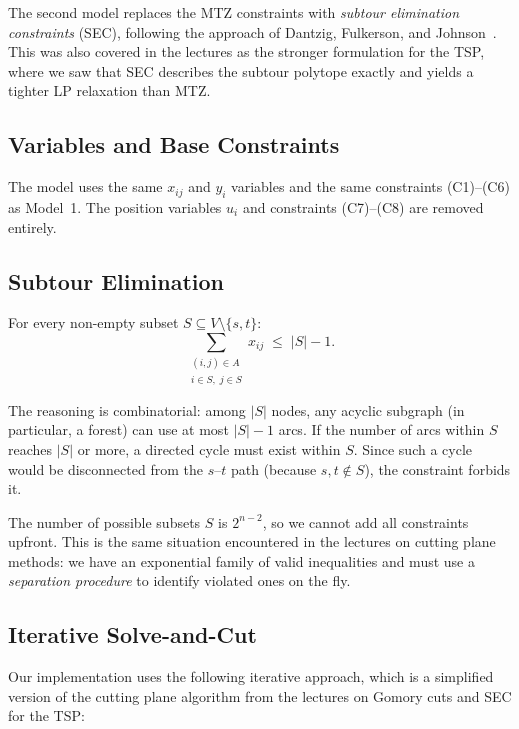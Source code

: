 \documentclass[12pt, a4paper]{article}
\begin{document}
The second model replaces the MTZ constraints with \emph{subtour elimination
constraints} (SEC), following the approach of Dantzig, Fulkerson, and
Johnson~\cite{dantzig}. This was also covered in the lectures as the
stronger formulation for the TSP, where we saw that SEC describes the subtour
polytope exactly and yields a tighter LP relaxation than MTZ.

\subsection{Variables and Base Constraints}

The model uses the same $x_{ij}$ and $y_i$ variables and the same constraints
(C1)--(C6) as Model~1. The position variables $u_i$ and constraints (C7)--(C8) are
removed entirely.

\subsection{Subtour Elimination}

For every non-empty subset $S \subseteq V \setminus \{s,t\}$:
\begin{equation}\label{eq:sec}
  \sum_{\substack{(i,j) \in A \\ i \in S,\; j \in S}} x_{ij}
  \;\leq\; |S| - 1.
  \tag{SEC}
\end{equation}

The reasoning is combinatorial: among $|S|$ nodes, any acyclic subgraph (in
particular, a forest) can use at most $|S|-1$ arcs. If the number of arcs within $S$
reaches $|S|$ or more, a directed cycle must exist within $S$. Since such a cycle
would be disconnected from the $s$--$t$ path (because $s,t \notin S$), the
constraint forbids it.

The number of possible subsets $S$ is $2^{n-2}$, so we cannot add all constraints
upfront. This is the same situation encountered in the lectures on cutting
plane methods: we have an exponential family of valid inequalities and must use a
\emph{separation procedure} to identify violated ones on the fly.

\subsection{Iterative Solve-and-Cut}

Our implementation uses the following iterative approach, which is a simplified
version of the cutting plane algorithm from the lectures on Gomory cuts and
SEC for the TSP:
\end{document}
